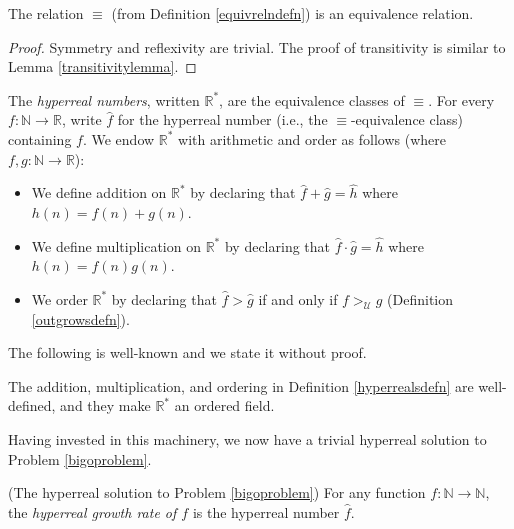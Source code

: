 \documentclass[twoside,11pt]{article}
\begin{document}
\begin{lemma}
    The relation $\equiv$ (from Definition \ref{equivrelndefn}) is an equivalence
    relation.
\end{lemma}

\begin{proof}
    Symmetry and reflexivity are trivial.
    The proof of transitivity is similar to Lemma \ref{transitivitylemma}.
\end{proof}

\begin{definition}
\label{hyperrealsdefn}
    The \emph{hyperreal numbers}, written $\mathbb R^*$,
    are the equivalence classes of $\equiv$.
    For every $f:\mathbb N\to\mathbb R$, write $\hat{f}$ for
    the hyperreal number (i.e., the $\equiv$-equivalence class) containing $f$.
    We endow $\mathbb R^*$ with arithmetic and order as follows
    (where $f,g:\mathbb N\to\mathbb R$):
    \begin{itemize}
        \item We define addition on $\mathbb R^*$ by declaring that
        $\hat{f}+\hat{g}=\hat{h}$
        where $h(n)=f(n)+g(n)$.
        \item We define multiplication on $\mathbb R^*$ by declaring that
        $\hat{f}\cdot \hat{g}=\hat{h}$
        where $h(n)=f(n)g(n)$.
        \item We order $\mathbb R^*$ by declaring that
        $\hat{f}>\hat{g}$ if and only if $f>_\mathcal U g$ (Definition \ref{outgrowsdefn}).
    \end{itemize}
\end{definition}

The following is well-known and we state it
without proof.

\begin{theorem}
    The addition, multiplication, and ordering in Definition \ref{hyperrealsdefn}
    are well-defined, and they make $\mathbb R^*$ an ordered field.
\end{theorem}

Having invested in this machinery,
we now have a trivial hyperreal solution to Problem \ref{bigoproblem}.

\begin{definition}
\label{hyperrealgrowthratedefn}
    (The hyperreal solution to Problem \ref{bigoproblem})
    For any function $f:\mathbb N\to\mathbb N$, the \emph{hyperreal growth rate
    of $f$} is the hyperreal number $\hat f$.
\end{definition}
\end{document}
